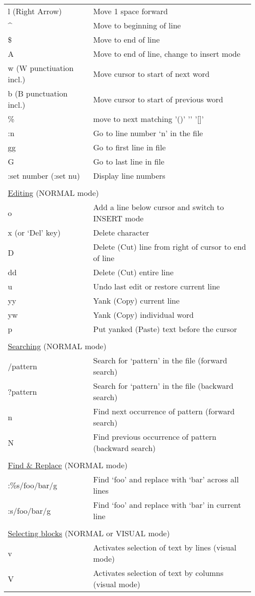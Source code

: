 \documentclass[11pt,a4paper,oneside]{article}
\begin{document}
\begin{table}
\begin{tabular}{p{4.5cm} l}
l (Right Arrow) & Move 1 space forward \\
\^{} & Move to beginning of line \\
\$ & Move to end of line \\
A & Move to end of line, change to insert mode \\
w (W punctiuation incl.) & Move cursor to start of next word \\
b (B punctuation incl.) & Move cursor to start of previous word \\
\% & move to next matching '()' '{}' '[]' \\
:n & Go to line number `n' in the file \\
gg & Go to first line in file \\
G & Go to last line in file \\
:set number (:set nu) & Display line numbers \\
 & \\[-1.5ex]
\multicolumn{2}{l}{\underline{Editing} (NORMAL mode)} \\
o & Add a line below cursor and switch to INSERT mode \\
x (or `Del' key) & Delete character \\
D & Delete (Cut) line from right of cursor to end of line \\
dd & Delete (Cut) entire line \\
u & Undo last edit or restore current line \\
yy & Yank (Copy) current line \\
yw & Yank (Copy) individual word \\
p & Put yanked (Paste) text before the cursor \\
 & \\[-1.5ex]
\multicolumn{2}{l}{\underline{Searching} (NORMAL mode)} \\
/pattern & Search for `pattern' in the file (forward search) \\
?pattern & Search for `pattern' in the file (backward search) \\
n & Find next occurrence of pattern (forward search) \\
N & Find previous occurrence of pattern (backward search) \\
 & \\[-1.5ex]
\multicolumn{2}{l}{\underline{Find \& Replace} (NORMAL mode)} \\
:\%s/foo/bar/g & Find `foo' and replace with `bar' across all lines \\
:s/foo/bar/g & Find `foo' and replace with `bar' in current line \\
 & \\[-1.5ex]
\multicolumn{2}{l}{\underline{Selecting blocks} (NORMAL or VISUAL mode)} \\
v & Activates selection of text by lines (visual mode) \\
V & Activates selection of text by columns (visual mode) \\


\end{tabular}
\end{table}
\end{document}
